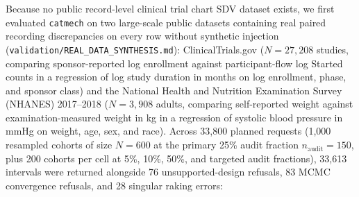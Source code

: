 \documentclass[
]{article}
\begin{document}
Because no public record-level clinical trial chart SDV dataset exists,
we first evaluated \texttt{catmech} on two large-scale public datasets
containing real paired recording discrepancies on every row without
synthetic injection (\texttt{validation/REAL\_DATA\_SYNTHESIS.md}):
ClinicalTrials.gov (\(N = 27,208\) studies, comparing sponsor-reported
log enrollment against participant-flow log Started counts in a
regression of log study duration in months on log enrollment, phase, and
sponsor class) and the National Health and Nutrition Examination Survey
(NHANES) 2017--2018 \citep{nhanes2018} (\(N = 3,908\) adults, comparing
self-reported weight against examination-measured weight in kg in a
regression of systolic blood pressure in mmHg on weight, age, sex, and
race). Across 33,800 planned requests (1,000 resampled cohorts of size
\(N = 600\) at the primary 25\% audit fraction
\(n_{\text{audit}} = 150\), plus 200 cohorts per cell at 5\%, 10\%,
50\%, and targeted audit fractions), 33,613 intervals were returned
alongside 76 unsupported-design refusals, 83 MCMC convergence refusals,
and 28 singular raking errors:
\end{document}
